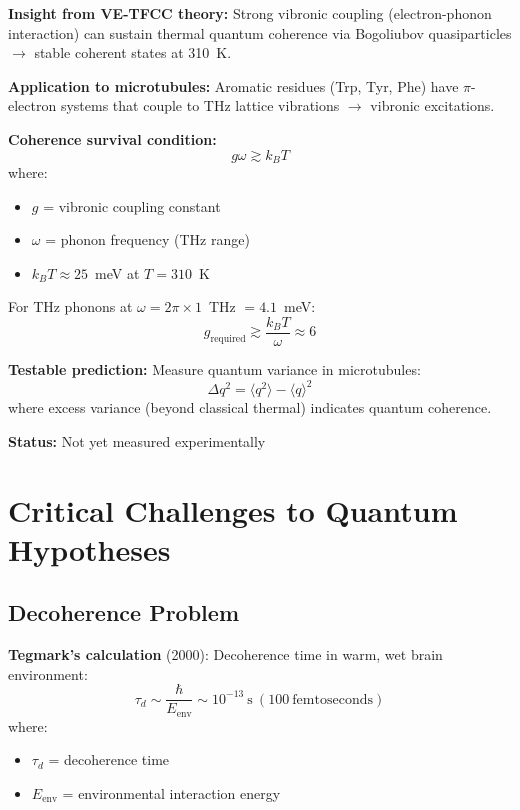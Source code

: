 \textbf{Insight from VE-TFCC theory:} Strong vibronic coupling (electron-phonon interaction) can sustain thermal quantum coherence via Bogoliubov quasiparticles $\rightarrow$ stable coherent states at 310~K.

\textbf{Application to microtubules:} Aromatic residues (Trp, Tyr, Phe) have $\pi$-electron systems that couple to THz lattice vibrations $\rightarrow$ vibronic excitations.

\textbf{Coherence survival condition:}
\begin{equation}
g \omega \gtrsim k_B T
\end{equation}
where:
\begin{itemize}
\item $g$ = vibronic coupling constant
\item $\omega$ = phonon frequency (THz range)
\item $k_B T \approx 25$~meV at $T = 310$~K
\end{itemize}

For THz phonons at $\omega = 2\pi \times 1$~THz $= 4.1$~meV:
\begin{equation}
g_{\mathrm{required}} \gtrsim \frac{k_B T}{\omega} \approx 6
\end{equation}

\textbf{Testable prediction:} Measure quantum variance in microtubules:
\begin{equation}
\Delta q^2 = \langle q^2 \rangle - \langle q \rangle^2
\end{equation}
where excess variance (beyond classical thermal) indicates quantum coherence.

\textbf{Status:} Not yet measured experimentally

\section{Critical Challenges to Quantum Hypotheses}

\subsection{Decoherence Problem}

\textbf{Tegmark's calculation} (2000): Decoherence time in warm, wet brain environment:
\begin{equation}
\tau_d \sim \frac{\hbar}{E_{\mathrm{env}}} \sim 10^{-13}\ \mathrm{s}\ (100\ \mathrm{femtoseconds})
\end{equation}
where:
\begin{itemize}
\item $\tau_d$ = decoherence time
\item $E_{\mathrm{env}}$ = environmental interaction energy
\end{itemize}

